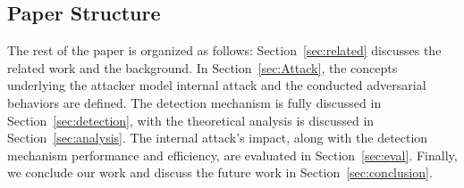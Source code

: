 % 
\subsection*{Paper Structure}
The rest of the paper is organized as follows: Section~\ref{sec:related} discusses the related work and the background.
In Section~\ref{sec:Attack}, the concepts underlying the attacker model internal attack and the conducted adversarial behaviors are defined.
The detection mechanism is fully discussed in Section~\ref{sec:detection}, with the theoretical analysis is discussed in Section~\ref{sec:analysis}.
The internal attack's impact, along with the detection mechanism performance and efficiency, are evaluated in Section~\ref{sec:eval}. Finally, we conclude our work and discuss the future work in Section~\ref{sec:conclusion}.





 


